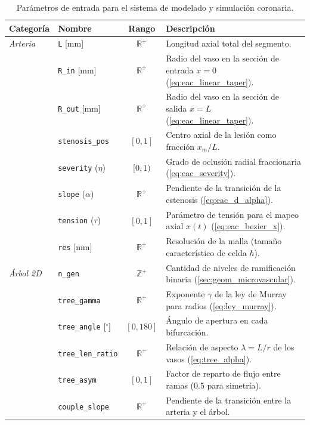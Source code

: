 \documentclass[12pt, letterpaper]{article}
\begin{document}
\begin{table}[htbp]
  \centering
  \caption{Parámetros de entrada para el sistema de modelado y simulación coronaria.}
  \label{tab:parametros_sistema}
  \small
  \begin{tabularx}{\textwidth}{@{} l l c X @{}}
    \toprule
    \textbf{Categoría} & \textbf{Nombre} & \textbf{Rango} & \textbf{Descripción} \\ \midrule
    \textit{Arteria} & \texttt{L} [mm] & $\mathbb{R}^{+}$ & Longitud axial total del segmento. \\
    & \texttt{R\_in} [mm] & $\mathbb{R}^{+}$ & Radio del vaso en la sección de entrada $x=0$ (\cref{eq:eac_linear_taper}). \\
    & \texttt{R\_out} [mm] & $\mathbb{R}^{+}$ & Radio del vaso en la sección de salida $x=L$ (\cref{eq:eac_linear_taper}). \\
    & \texttt{stenosis\_pos} & $[0, 1]$ & Centro axial de la lesión como fracción $x_m / L$. \\
    & \texttt{severity} ($\eta$) & $[0, 1)$ & Grado de oclusión radial fraccionaria (\cref{eq:eac_severity}). \\
    & \texttt{slope} ($\alpha$) & $\mathbb{R}^{+}$ & Pendiente de la transición de la estenosis (\cref{eq:eac_d_alpha}). \\
    & \texttt{tension} ($\tau$) & $[0, 1]$ & Parámetro de tensión para el mapeo axial $x(t)$ (\cref{eq:eac_bezier_x}). \\
    & \texttt{res} [mm] & $\mathbb{R}^{+}$ & Resolución de la malla (tamaño característico de celda $h$). \\ \midrule
    \textit{Árbol 2D} & \texttt{n\_gen} & $\mathbb{Z}^{+}$ & Cantidad de niveles de ramificación binaria (\cref{sec:geom_microvascular}). \\
    & \texttt{tree\_gamma} & $\mathbb{R}^{+}$ & Exponente $\gamma$ de la ley de Murray para radios (\cref{eq:ley_murray}). \\
    & \texttt{tree\_angle} [$^\circ$] & $[0, 180]$ & Ángulo de apertura en cada bifurcación. \\
    & \texttt{tree\_len\_ratio} & $\mathbb{R}^{+}$ & Relación de aspecto $\lambda = L/r$ de los vasos (\cref{eq:tree_alpha}). \\
    & \texttt{tree\_asym} & $[0, 1]$ & Factor de reparto de flujo entre ramas (0.5 para simetría). \\
    & \texttt{couple\_slope} & $\mathbb{R}^{+}$ & Pendiente de la transición entre la arteria y el árbol. \\ \midrule

\end{tabularx}
\end{table}
\end{document}
